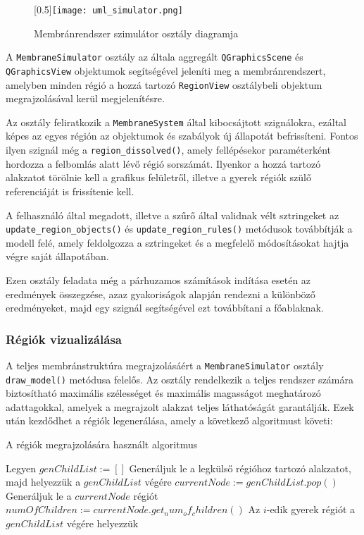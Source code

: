 \begin{figure}[H]
	\scalebox{0.5}[0.5]{\texttt{[image: uml\_simulator.png]}}
	\caption{Membránrendszer szimulátor osztály diagramja}
	\label{fig:uml_simulator}
\end{figure}

A \verb|MembraneSimulator| osztály az általa aggregált \verb|QGraphicsScene| és \verb|QGraphicsView| objektumok segítségével jeleníti meg a membránrendszert, amelyben minden régió a hozzá tartozó \verb|RegionView| osztálybeli objektum megrajzolásával kerül megjelenítésre. 

Az osztály feliratkozik a \verb|MembraneSystem| által kibocsájtott szignálokra, ezáltal képes az egyes régión az objektumok és szabályok új állapotát befrissíteni. Fontos ilyen szignál még a \verb|region_dissolved()|, amely fellépésekor paraméterként hordozza a felbomlás alatt lévő régió sorszámát. Ilyenkor a hozzá tartozó alakzatot törölnie kell a  grafikus felületről, illetve a gyerek régiók szülő referenciáját is frissítenie kell. 

A felhasználó által megadott, illetve a szűrő által validnak vélt sztringeket az \verb|update_region_objects()| és \verb|update_region_rules()| metódusok továbbítják a modell felé, amely feldolgozza a sztringeket és a megfelelő módosításokat hajtja végre saját állapotában.

Ezen osztály feladata még a párhuzamos számítások indítása esetén az eredmények összegzése, azaz gyakoriságok alapján rendezni a különböző eredményeket, majd egy szignál segítségével ezt továbbítani a főablaknak.

\subsubsection{Régiók vizualizálása}

A teljes membránstruktúra megrajzolásáért a \verb|MembraneSimulator| osztály \verb|draw_model()| metódusa felelős. Az osztály rendelkezik a teljes rendszer számára biztosítható maximális szélességet és maximális magasságot meghatározó adattagokkal, amelyek a megrajzolt alakzat teljes láthatóságát garantálják. Ezek után kezdődhet a régiók legenerálása, amely a következő algoritmust követi:

\begin{algorithm}[H]
\caption{A régiók megrajzolására használt algoritmus}
\label{alg:draw_model}
\begin{algorithmic}[1] %
\State Legyen $genChildList := []$
\State Generáljuk le a legkülső régióhoz tartozó alakzatot, majd helyezzük a  $genChildList$ végére
	\State $currentNode := genChildList.pop()$
	\State Generáljuk le a $currentNode$ régiót
	\State $numOfChildren := currentNode.get_num_of_children()$
		\State Az $i$-edik gyerek régiót a $genChildList$ végére helyezzük
		\EndFor
	\EndIf
\EndWhile
\end{algorithmic}
\end{algorithm}

